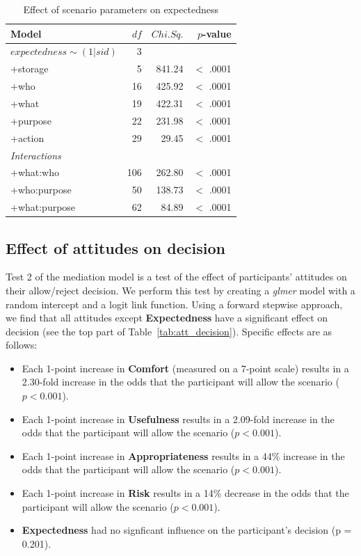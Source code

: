 \begin{table}
	\centering
	\caption{Effect of scenario parameters on expectedness}
	\label{tab:para_exp}
	\begin{tabular}{ l | r | r | r }
		\hline
		Model &	$df$ & $Chi. Sq.$ & $p$-value 	\\ \hline
		$expectedness\sim(1 | sid)$ &	3	  	&	    &				\\
		+storage &					5	& 	  841.24 & 		$<$ .0001 	\\
		+who &					16 &		  425.92 &		$<$ .0001 	\\
		+what &				19 & 	  422.31 & 		  	$<$ .0001	\\
		+purpose &			22 &		  231.98 & 		$<$ .0001 	\\
		+action &			29 &		  29.45& 		$<$ .0001\\\hline
		\emph{Interactions}&			 &		  & \\\hline
		+what:who &			106 &		  262.80 & 		$<$ .0001\\
		+who:purpose &			50 &		  138.73 & 		$<$ .0001\\
		+what:purpose &			62 &		  84.89 & 		$<$ .0001\\
		\hline
	\end{tabular}
\end{table}

\subsection{Effect of attitudes on decision}
Test 2 of the mediation model is a test of the effect of participants' attitudes on their allow/reject decision. We perform this test by creating a \emph{glmer} model with a random intercept and a logit link function. Using a forward stepwise approach, we find that all attitudes except \textbf{Expectedness} have a significant effect on decision (see the top part of Table~\ref{tab:att_decision}). Specific effects are as follows:
\begin{itemize}
	\item Each 1-point increase in \textbf{Comfort} (measured on a 7-point scale) results in a 2.30-fold increase in the odds that the participant will allow the scenario ($p < 0.001$). 
	\item Each 1-point increase in \textbf{Usefulness} results in a 2.09-fold increase in the odds that the participant will allow the scenario ($p < 0.001$).
	\item Each 1-point increase in \textbf{Appropriateness} results in a 44\% increase in the odds that the participant will allow the scenario ($p < 0.001$).
	\item Each 1-point increase in \textbf{Risk} results in a 14\% decrease in the odds that the participant will allow the scenario ($p < 0.001$).
	\item \textbf{Expectedness} had no signficant influence on the participant's decision (p = 0.201).
\end{itemize}


